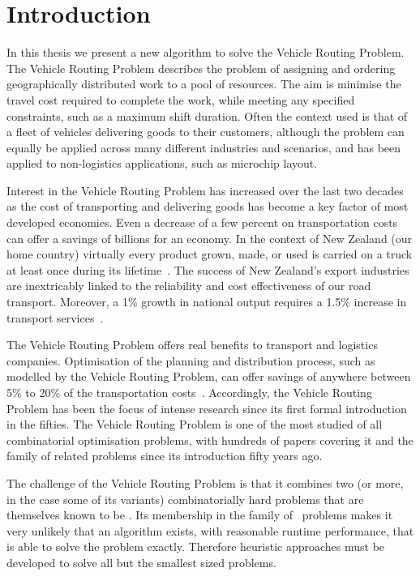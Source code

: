 
\chapter{Introduction}

In this thesis we present a new algorithm to solve the Vehicle Routing Problem. The Vehicle Routing Problem describes the problem of assigning and ordering geographically distributed work to a pool of resources. The aim is minimise the travel cost required to complete the work, while meeting any specified constraints, such as a maximum shift duration. Often the context used is that of a fleet of vehicles delivering goods to their customers, although the problem can equally be applied across many different industries and scenarios, and has been applied to non-logistics applications, such as microchip layout. 

Interest in the Vehicle Routing Problem has increased over the last two decades as the cost of transporting and delivering goods has become a key factor of most developed economies. Even a decrease of a few percent on transportation costs can offer a savings of billions for an economy. In the context of New Zealand (our home country) virtually every product grown, made, or used is carried on a truck at least once during its lifetime~\cite{RTFNZ}. The success of New Zealand's export industries are inextricably linked to the reliability and cost effectiveness of our road transport. Moreover, a 1\% growth in national output requires a 1.5\% increase in transport services~\cite{RTFNZ}. 

The Vehicle Routing Problem offers real benefits to transport and logistics companies. Optimisation of the planning and distribution process, such as modelled by the Vehicle Routing Problem, can offer savings of anywhere between 5\% to 20\% of the transportation costs~\cite{TV2001}. Accordingly, the Vehicle Routing Problem has been the focus of intense research since its first formal introduction in the fifties. The Vehicle Routing Problem is one of the most studied of all combinatorial optimisation problems, with hundreds of papers covering it and the family of related problems since its introduction fifty years ago.

The challenge of the Vehicle Routing Problem is that it combines two (or more, in the case some of its variants) combinatorially hard problems that are themselves known to be \nphard. Its membership in the family of \nphard\ problems makes it very unlikely that an algorithm exists, with reasonable runtime performance, that is able to solve the problem exactly. Therefore heuristic approaches must be developed to solve all but the smallest sized problems.

